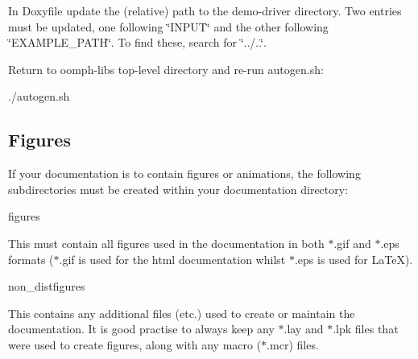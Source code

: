 \begin{DoxyEnumerate}
\item In {\ttfamily Doxyfile} update the (relative) path to the demo-\/driver directory. Two entries must be updated, one following {\ttfamily \char`\"{}\+I\+N\+P\+U\+T\char`\"{}} and the other following {\ttfamily \char`\"{}\+E\+X\+A\+M\+P\+L\+E\+\_\+\+P\+A\+T\+H\char`\"{}}. To find these, search for {\ttfamily \char`\"{}../..\char`\"{}}.
\item Return to {\ttfamily oomph-\/lib\textquotesingle{}s} top-\/level directory and re-\/run {\ttfamily autogen}.{\ttfamily sh\+:} 
\begin{DoxyCode}
./autogen.sh 
\end{DoxyCode}

\end{DoxyEnumerate}\hypertarget{index_figures_setup}{}\subsection{Figures}\label{index_figures_setup}
If your documentation is to contain figures or animations, the following subdirectories must be created within your documentation directory\+:
\begin{DoxyItemize}
\item {\ttfamily figures} 
\begin{DoxyItemize}
\item This must contain all figures used in the documentation in both {\ttfamily $\ast$}.{\ttfamily gif} and {\ttfamily $\ast$}.{\ttfamily eps} formats ({\ttfamily $\ast$}.{\ttfamily gif} is used for the {\ttfamily html} documentation whilst {\ttfamily $\ast$}.{\ttfamily eps} is used for {\ttfamily La\+TeX}).
\end{DoxyItemize}
\item {\ttfamily non\+\_\+distfigures} 
\begin{DoxyItemize}
\item This contains any additional files (etc.) used to create or maintain the documentation. It is good practise to always keep any {\ttfamily $\ast$}.{\ttfamily lay} and {\ttfamily $\ast$}.{\ttfamily lpk} files that were used to create figures, along with any macro ({\ttfamily $\ast$}.{\ttfamily mcr}) files.
\end{DoxyItemize}
\end{DoxyItemize}



